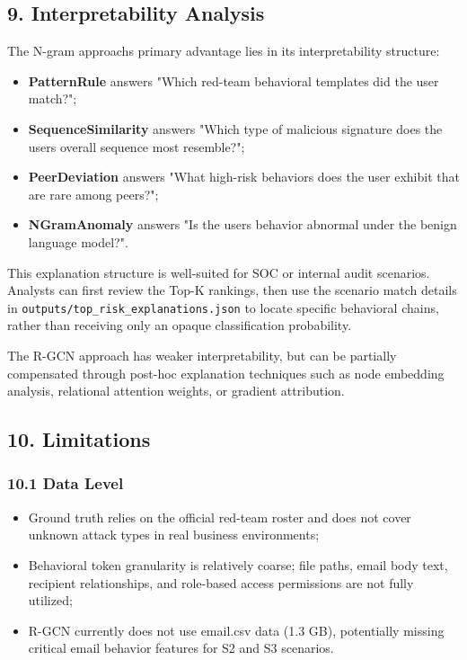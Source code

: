 \documentclass[
  a4paper,
  11pt]{article}
\providecommand{\tightlist}{%
  \setlength{\itemsep}{0pt}\setlength{\parskip}{0pt}}
\begin{document}
\subsection{9. Interpretability
Analysis}\label{9-interpretability-analysis}

The N-gram approach\textquotesingle s primary advantage lies in its
interpretability structure:

\begin{itemize}
\tightlist
\item
  \textbf{PatternRule} answers "Which red-team behavioral templates did
  the user match?";
\item
  \textbf{SequenceSimilarity} answers "Which type of malicious signature
  does the user\textquotesingle s overall sequence most resemble?";
\item
  \textbf{PeerDeviation} answers "What high-risk behaviors does the user
  exhibit that are rare among peers?";
\item
  \textbf{NGramAnomaly} answers "Is the user\textquotesingle s behavior
  abnormal under the benign language model?".
\end{itemize}

This explanation structure is well-suited for SOC or internal audit
scenarios. Analysts can first review the Top-K rankings, then use the
scenario match details in \texttt{outputs/top\_risk\_explanations.json}
to locate specific behavioral chains, rather than receiving only an
opaque classification probability.

The R-GCN approach has weaker interpretability, but can be partially
compensated through post-hoc explanation techniques such as node
embedding analysis, relational attention weights, or gradient
attribution.

\subsection{10. Limitations}\label{10-limitations}

\subsubsection{10.1 Data Level}\label{101-data-level}

\begin{itemize}
\tightlist
\item
  Ground truth relies on the official red-team roster and does not cover
  unknown attack types in real business environments;
\item
  Behavioral token granularity is relatively coarse; file paths, email
  body text, recipient relationships, and role-based access permissions
  are not fully utilized;
\item
  R-GCN currently does not use email.csv data (1.3 GB), potentially
  missing critical email behavior features for S2 and S3 scenarios.
\end{itemize}
\end{document}
